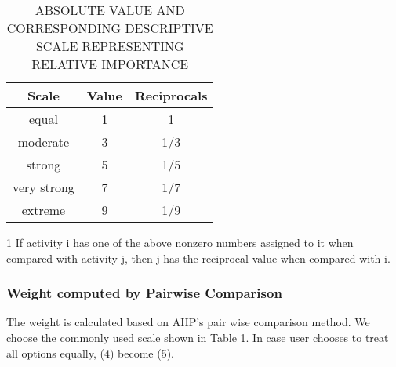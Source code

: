 \documentclass[journal]{IEEEtran}
\begin{document}
\begin{table}[!h]
\begin{center}\caption{ABSOLUTE VALUE AND CORRESPONDING DESCRIPTIVE SCALE REPRESENTING RELATIVE IMPORTANCE} \label{table:scale}
\begin{tabular}{|c|c|c|}
\hline
\textbf{Scale }&  \textbf{Value } & Reciprocals\tnote{1} \\
\hline equal & 1 & 1\\
\hline moderate & 3 & 1/3 \\
\hline strong & 5 & 1/5 \\
\hline very strong & 7 & 1/7 \\
\hline extreme & 9 & 1/9\\
\hline
\end{tabular}
\begin{tablenotes}
  \item[1] If activity i has one of the above nonzero numbers assigned to it when compared with activity j, then j has the reciprocal value when compared with i.
\end{tablenotes}

\end{center}
\end{table}


\subsubsection{Weight computed by Pairwise Comparison}
\label{subsec:weight&pairwise_comparison}

The weight is calculated based on AHP's pair wise comparison method. We choose the commonly used scale    \cite{ghodsypour1998decision}   \cite{haas2005illustrated} shown in Table \ref{table:scale}. In case user chooses to treat all options equally, (4) become (5).
\end{document}
